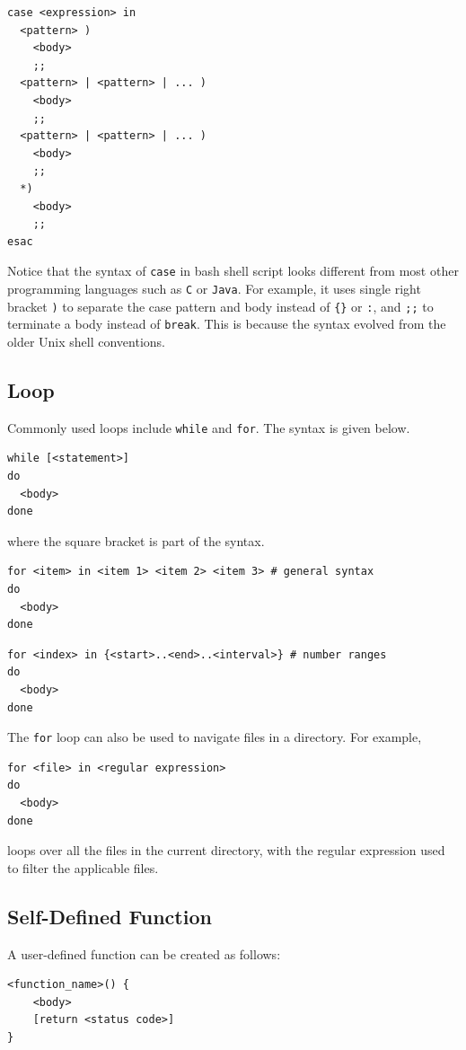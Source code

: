 \begin{lstlisting}
case <expression> in
  <pattern> )
    <body>
    ;;
  <pattern> | <pattern> | ... )
    <body>
    ;;
  <pattern> | <pattern> | ... )
    <body>
    ;;
  *)
    <body>
    ;;
esac
\end{lstlisting}

Notice that the syntax of \verb|case| in bash shell script looks different from most other programming languages such as \verb|C| or \verb|Java|. For example, it uses single right bracket \verb|)| to separate the case pattern and body instead of \verb|{}| or \verb|:|, and \verb|;;| to terminate a body instead of \verb|break|. This is because the syntax evolved from the older Unix shell conventions.

\subsection{Loop}

Commonly used loops include \verb|while| and \verb|for|. The syntax is given below.

\begin{lstlisting}
while [<statement>]
do
  <body>
done
\end{lstlisting}
where the square bracket is part of the syntax.

\begin{lstlisting}
for <item> in <item 1> <item 2> <item 3> # general syntax
do
  <body>
done
\end{lstlisting}

\begin{lstlisting}
for <index> in {<start>..<end>..<interval>} # number ranges
do
  <body>
done
\end{lstlisting}

The \verb|for| loop can also be used to navigate files in a directory. For example,
\begin{lstlisting}
for <file> in <regular expression>
do
  <body>
done
\end{lstlisting}
loops over all the files in the current directory, with the regular expression used to filter the applicable files.

\subsection{Self-Defined Function}

A user-defined function can be created as follows:
\begin{lstlisting}
<function_name>() {
    <body>
    [return <status code>]
}
\end{lstlisting}

